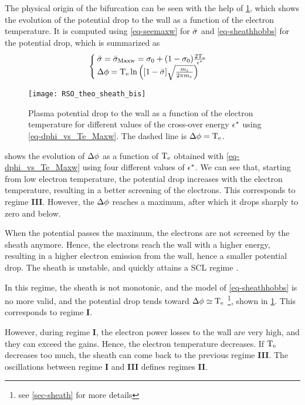    
   The physical origin of the bifurcation can be seen with the help of \cref{fig-dphivsTe}, which shows the evolution of the potential drop to the wall as a function of the electron temperature.
   It is computed using \cref{eq-seemaxw} for $ \bar{\sigma }$ and \cref{eq-sheathhobbs} for the potential drop, which is summarized as 
   \begin{equation} \label{eq-dphi_vs_Te_Maxw}
     \begin{cases}
        \bar{\sigma } =  \bar{\sigma }_{\rm Maxw} = \sigma _0 + (1- \sigma _0) \frac{2 \mathrm{T_e}}{\epsilon^{*}} \\
       \Delta \phi = \mathrm{T_e} \ln \left( [1 -  \bar{\sigma }] \sqrt{ \frac{m_i}{2 \pi m_e}}  \right)
     \end{cases}
   \end{equation}

   \begin{figure}[hbt]
     \centering
     \texttt{[image: RSO\_theo\_sheath\_bis]}
     \caption{Plasma potential drop to the wall as a function of the electron temperature for different values of the cross-over energy $\epsilon^{*}$ using \cref{eq-dphi_vs_Te_Maxw}. The dashed line is $\Delta \phi=\mathrm{T_e}$. }
     \label{fig-dphivsTe}
   \end{figure}
   
    shows the evolution of $\Delta \phi$ as a function of $\mathrm{T_e}$ obtained with \cref{eq-dphi_vs_Te_Maxw} using four different values of $\epsilon^{*}$. 
   We can see that, starting from low electron temperature, the potential drop increases with the electron temperature, resulting in a better screening of the electrons.
   This corresponds to regime {\bf III}.
   However, the $\Delta \phi$ reaches a maximum, after which it drops sharply to zero and below.
   
   When the potential passes the maximum, the electrons are not screened by the sheath anymore.
   Hence, the electrons reach the wall with a higher energy, resulting in a higher electron emission from the wall, hence a smaller potential drop.
   The sheath is unstable, and quickly attains a \ac{SCL} regime \citep{raitses2005}.
   
   In this regime, the sheath is not monotonic, and the model of \cref{eq-sheathhobbs} is no more valid, and the potential drop tends toward $\Delta \phi \simeq \mathrm{T_e}$ \citep{hobbs1967,goebel2008} \footnote{see \cref{sec-sheath} for more details}, shown in \cref{fig-dphivsTe}.
   This corresponds to regime {\bf I}.
   
   However, during regime {\bf I}, the electron power losses to the wall are very high, and they can exceed the gains.
   Hence, the electron temperature decreases.
   If $\mathrm{T_e}$ decreases too much, the sheath can come back to the previous regime {\bf III}.
   The oscillations between regime {\bf I} and {\bf III} defines regimes {\bf II}.
      
